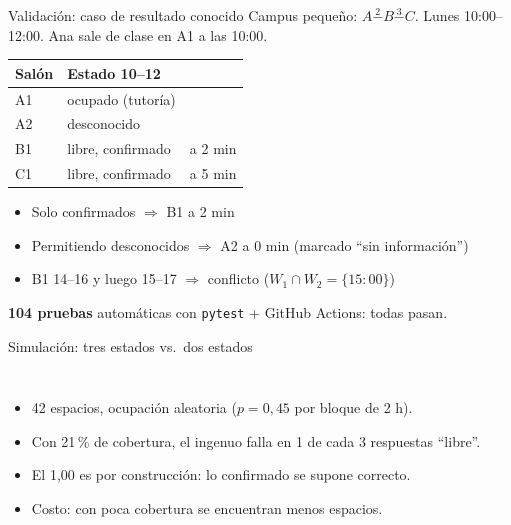 \documentclass[aspectratio=169,11pt]{beamer}
\begin{document}
\begin{frame}{Validación: caso de resultado conocido}
Campus pequeño: $A\overset{2}{-}B\overset{3}{-}C$. Lunes 10:00--12:00. Ana sale de clase en A1 a las 10:00.
\begin{center}
\begin{tabular}{@{}lll@{}}
\toprule
Salón & Estado 10--12 & \\
\midrule
A1 & ocupado (tutoría) & \\
A2 & desconocido & \\
B1 & libre, confirmado & a 2 min \\
C1 & libre, confirmado & a 5 min \\
\bottomrule
\end{tabular}
\end{center}
\begin{itemize}
  \item Solo confirmados $\Rightarrow$ \alert{B1 a 2 min} \checkmark
  \item Permitiendo desconocidos $\Rightarrow$ A2 a 0 min (marcado ``sin información'') \checkmark
  \item B1 14--16 y luego 15--17 $\Rightarrow$ conflicto ($W_1\cap W_2=\{15{:}00\}$) \checkmark
\end{itemize}
\small \textbf{104 pruebas} automáticas con \texttt{pytest} + GitHub Actions: todas pasan.
\end{frame}

\begin{frame}{Simulación: tres estados vs.\ dos estados}
\begin{columns}[c]
\small
\begin{itemize}
  \item 42 espacios, ocupación aleatoria ($p=0{,}45$ por bloque de 2 h).
  \item Con 21\,\% de cobertura, el ingenuo falla en \alert{1 de cada 3} respuestas ``libre''.
  \item El 1,00 es por construcción: lo confirmado se supone correcto.
  \item Costo: con poca cobertura se encuentran menos espacios.
\end{itemize}
\end{columns}
\end{frame}
\end{document}
